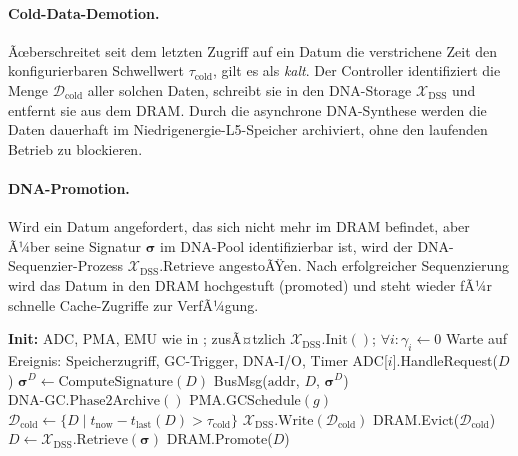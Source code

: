 ﻿\documentclass[a4paper,12pt]{article}
\theoremstyle{definition}
\begin{document}
\paragraph{Cold-Data-Demotion.}
Ãœberschreitet seit dem letzten Zugriff auf ein Datum die verstrichene Zeit den konfigurierbaren Schwellwert $\tau_{\mathrm{cold}}$, gilt es als \emph{kalt}. Der Controller identifiziert die Menge $\mathcal{D}_{\mathrm{cold}}$ aller solchen Daten, schreibt sie in den DNA-Storage $\mathcal{X}_{\mathrm{DSS}}$ und entfernt sie aus dem DRAM. Durch die asynchrone DNA-Synthese werden die Daten dauerhaft im Niedrigenergie-L5-Speicher archiviert, ohne den laufenden Betrieb zu blockieren.

\paragraph{DNA-Promotion.}
Wird ein Datum angefordert, das sich nicht mehr im DRAM befindet, aber Ã¼ber seine Signatur $\boldsymbol{\sigma}$ im DNA-Pool identifizierbar ist, wird der DNA-Sequenzier-Prozess $\mathcal{X}_{\mathrm{DSS}}.\mathrm{Retrieve}$ angestoÃŸen. Nach erfolgreicher Sequenzierung wird das Datum in den DRAM hochgestuft (promoted) und steht wieder fÃ¼r schnelle Cache-Zugriffe zur VerfÃ¼gung.

\begin{algorithm}[H]
  \caption{PYMDNA-8 Unified Controller -- Hauptschleife}
  \label{alg:pymdna8_main}
  \begin{algorithmic}[1]
    \State \textbf{Init:} ADC, PMA, EMU wie in \cite{epp2026pymca8};
      zusÃ¤tzlich $\mathcal{X}_{\mathrm{DSS}}.\mathrm{Init}()$;
      $\forall i: \gamma_i \gets 0$
    \Repeat
      \State Warte auf Ereignis: Speicherzugriff, GC-Trigger, DNA-I/O, Timer
        \State ADC[$i$].HandleRequest($D$) 
        \State $\boldsymbol{\sigma}^D \gets \mathrm{ComputeSignature}(D)$
        \State BusMsg($\mathrm{addr}$, $D$, $\boldsymbol{\sigma}^D$)
      \EndIf
          \State $\mathrm{DNA\text{-}GC}.\mathrm{Phase2Archive}()$
        \EndIf
        \State $\mathrm{PMA}.\mathrm{GCSchedule}(g)$
      \EndIf
        \State $\mathcal{D}_{\mathrm{cold}} \gets \{D \mid t_{\mathrm{now}} - t_{\mathrm{last}}(D) > \tau_{\mathrm{cold}}\}$
        \State $\mathcal{X}_{\mathrm{DSS}}.\mathrm{Write}(\mathcal{D}_{\mathrm{cold}})$
        \State DRAM.Evict($\mathcal{D}_{\mathrm{cold}}$)
      \EndIf
        \State $D \gets \mathcal{X}_{\mathrm{DSS}}.\mathrm{Retrieve}(\boldsymbol{\sigma})$
        \State DRAM.Promote($D$) 
      \EndIf
  \end{algorithmic}
\end{algorithm}
\end{document}
